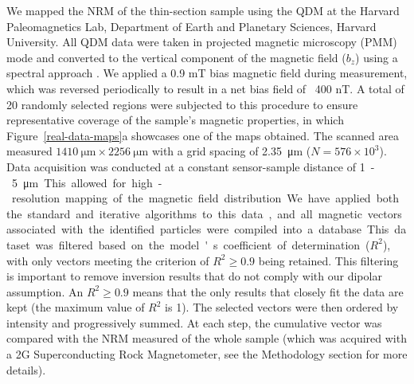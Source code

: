 We mapped the NRM of the thin-section sample using the QDM at the Harvard Paleomagnetics Lab, Department of Earth and Planetary Sciences, Harvard University. All QDM data were taken in projected magnetic microscopy (PMM) mode and converted to the vertical component of the magnetic field ($b_z$) using a spectral approach \citep{Fu2020, Glenn2017, Lima2009}. We applied a 0.9 mT bias magnetic field during measurement, which was reversed periodically to result in a net bias field of ~400 nT. A total of 20 randomly selected regions were subjected to this procedure to ensure representative coverage of the sample's magnetic properties, in which Figure~\ref{real-data-maps}a showcases one of the maps obtained. The scanned area measured $\qty{1410}{\um} \times \qty{2256}{\um}$ with a grid spacing of \qty{2.35}{\um} ($N = 576 \times 10^{3}$). Data acquisition was conducted at a constant sensor-sample distance of \qty{1} - \qty{5}{\um}. This allowed for high-resolution mapping of the magnetic field distribution.

We have applied both the standard and iterative algorithms to this data, and all magnetic vectors associated with the identified particles were compiled into a database. This dataset was filtered based on the model's coefficient of determination ($R^2$), with only vectors meeting the criterion of $R^2 \geq 0.9$ being retained. This filtering is important to remove inversion results that do not comply with our dipolar assumption. An $R^2 \geq 0.9$ means that the only results that closely fit the data are kept (the maximum value of $R^2$ is 1).  The selected vectors were then ordered by intensity and progressively summed. At each step, the cumulative vector was compared with the NRM measured of the whole sample (which was acquired with a 2G Superconducting Rock Magnetometer, see the Methodology section for more details).

